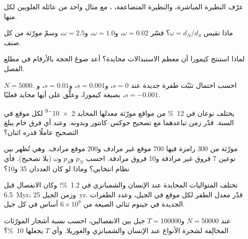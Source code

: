 \begin{exercise}[$\star$]\label{exo:b3:molecular-evolution:2}
عرّف النظيرة المباشرة، والنظيرة المتضاعفة، ،
مع مثال واحد من عائلة الغلوبين لكل منها.
\end{exercise}

\begin{exercise}[$\star$]\label{exo:b3:molecular-evolution:3}
ماذا تقيس $\omega = d_{N}/d_{S}$؟ فسّر $\omega = 0.02$،
و$\omega = 1.0$، و$\omega = 2.5$، وسمّ مورّثة من كل صنف.
\end{exercise}

\begin{exercise}[$\star$]\label{exo:b3:molecular-evolution:4}
لماذا استنتج كيمورا أن معظم الاستبدالات محايدة؟ أعد صوغ
الحجة بالأرقام في مطلع الفصل.
\end{exercise}

\begin{exercise}[$\star\star$]\label{exo:b3:molecular-evolution:5}
$N = 5000$. احسب احتمال تثبّت طفرة جديدة عند $s
= 0$، و$s = 0.001$، و$s = 0.01$، و$s = -0.001$، بصيغة كيمورا،
وعلّق على أيها محايد فعليًا.
\end{exercise}

\begin{exercise}[$\star\star$]\label{exo:b3:molecular-evolution:6}
يختلف نوعان في \qty{12}{\%} من مواقع مورّثة معدلها المحايد
\qty{2e-9}{} لكل موقع في السنة. قدّر زمن تباعدهما مع تصحيح
جوكس--كانتور وبدونه. وعند أي فرق خام يبلغ التصحيح عاملًا قدره اثنان؟
\end{exercise}

\begin{exercise}[$\star\star$]\label{exo:b3:molecular-evolution:7}
مورّثة من 300 رامزة فيها 700 موقع غير مرادف و200 موقع مرادف.
وهي تُظهر بين نوعين 7 فروق غير مرادفة و10 فروق مرادفة. احسب
$p_{N}$ و$p_{S}$ و$\omega$ (بلا تصحيح). فأي نظام انتخابي؟ وماذا
لو كان العددان 35 و10؟
\end{exercise}

\begin{exercise}[$\star\star$]\label{exo:b3:molecular-evolution:8}
تختلف المتواليات المحايدة عند الإنسان والشمبانزي في
\qty{1.2}{\%}؛ وكان الانفصال قبل \qty{6.5}{Myr}، وزمن الجيل
\qty{25}{yr}. قدّر معدل الطفر لكل موقع في الجيل، وعدد الطفرات
الجديدة في جينوم ثنائي الصيغة من $6\times 10^{9}$ أساس في كل جيل.
\end{exercise}

\begin{exercise}[$\star\star$]\label{exo:b3:molecular-evolution:9}
عند $N = \num{50000}$ و$T = \num{100000}$ جيل بين
الانفصالين، احسب نسبة أشجار المورّثات المخالِفة لشجرة
الأنواع عند الإنسان والشمبانزي والغوريلا. وأي $T$ يجعلها
\qty{10}{\%}؟
\end{exercise}

